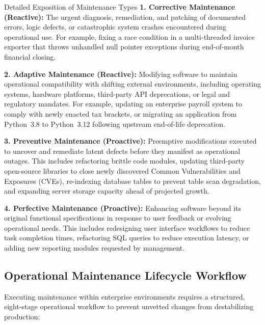 \documentclass[11pt,a4paper]{article}
\begin{document}
\begin{conceptcard}{Detailed Exposition of Maintenance Types}
\textbf{1. Corrective Maintenance (Reactive):} The urgent diagnosis, remediation, and patching of documented errors, logic defects, or catastrophic system crashes encountered during operational use. For example, fixing a race condition in a multi-threaded invoice exporter that throws unhandled null pointer exceptions during end-of-month financial closing.

\textbf{2. Adaptive Maintenance (Reactive):} Modifying software to maintain operational compatibility with shifting external environments, including operating systems, hardware platforms, third-party API deprecations, or legal and regulatory mandates. For example, updating an enterprise payroll system to comply with newly enacted tax brackets, or migrating an application from Python~3.8 to Python~3.12 following upstream end-of-life deprecation.

\textbf{3. Preventive Maintenance (Proactive):} Preemptive modifications executed to uncover and remediate latent defects before they manifest as operational outages. This includes refactoring brittle code modules, updating third-party open-source libraries to close newly discovered Common Vulnerabilities and Exposures (CVEs), re-indexing database tables to prevent table scan degradation, and expanding server storage capacity ahead of projected growth.

\textbf{4. Perfective Maintenance (Proactive):} Enhancing software beyond its original functional specifications in response to user feedback or evolving operational needs. This includes redesigning user interface workflows to reduce task completion times, refactoring SQL queries to reduce execution latency, or adding new reporting modules requested by management.
\end{conceptcard}

\subsection{Operational Maintenance Lifecycle Workflow}
Executing maintenance within enterprise environments requires a structured, eight-stage operational workflow to prevent unvetted changes from destabilizing production:
\end{document}
